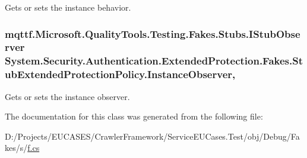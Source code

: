 Gets or sets the instance behavior.

\hypertarget{class_system_1_1_security_1_1_authentication_1_1_extended_protection_1_1_fakes_1_1_stub_extended_protection_policy_a9df1266a4cbad44bc3d1f3e41e3ff606}{
\subsubsection[{Instance\-Observer}]{\setlength{\rightskip}{0pt plus 5cm}mqttf.\-Microsoft.\-Quality\-Tools.\-Testing.\-Fakes.\-Stubs.\-I\-Stub\-Observer System.\-Security.\-Authentication.\-Extended\-Protection.\-Fakes.\-Stub\-Extended\-Protection\-Policy.\-Instance\-Observer\hspace{0.3cm}{\ttfamily [get]}, {\ttfamily [set]}}}\label{class_system_1_1_security_1_1_authentication_1_1_extended_protection_1_1_fakes_1_1_stub_extended_protection_policy_a9df1266a4cbad44bc3d1f3e41e3ff606}


Gets or sets the instance observer.



The documentation for this class was generated from the following file\-:\begin{DoxyCompactItemize}
\item 
D\-:/\-Projects/\-E\-U\-C\-A\-S\-E\-S/\-Crawler\-Framework/\-Service\-E\-U\-Cases.\-Test/obj/\-Debug/\-Fakes/s/\hyperlink{s_2f_8cs}{f.\-cs}\end{DoxyCompactItemize}
